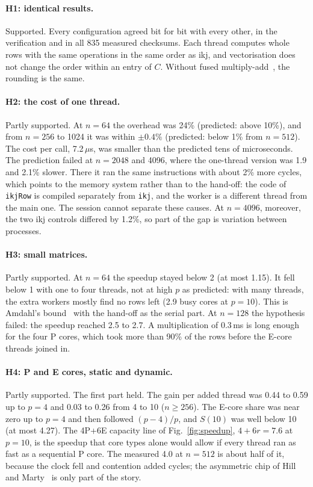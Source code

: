 \documentclass[11pt,a4paper]{article}
\begin{document}
\paragraph{H1: identical results.} Supported. Every configuration agreed bit
for bit with every other, in the verification and in all 835 measured
checksums. Each thread computes whole rows with the same operations in the same
order as ikj, and vectorisation does not change the order within an entry of
$C$. Without fused multiply-add~\cite{jep306}, the rounding is the same.

\paragraph{H2: the cost of one thread.} Partly supported. At $n=64$ the
overhead was 24\% (predicted: above 10\%), and from $n=256$ to 1024 it was
within $\pm0.4\%$ (predicted: below 1\% from $n=512$). The cost per call,
7.2\,$\mu$s, was smaller than the predicted tens of microseconds. The prediction
failed at $n=2048$ and 4096, where the one-thread version was 1.9 and 2.1\%
slower. There it ran the same instructions with about 2\% more cycles, which
points to the memory system rather than to the hand-off: the code of
\texttt{ikjRow} is compiled separately from \texttt{ikj}, and the worker is a
different thread from the main one. The session cannot separate these causes.
At $n=4096$, moreover, the two ikj controls differed by 1.2\%, so part of the
gap is variation between processes.

\paragraph{H3: small matrices.} Partly supported. At $n=64$ the speedup stayed
below 2 (at most 1.15). It fell below 1 with one to four threads, not at high
$p$ as predicted: with many threads, the extra workers mostly find no rows left
(2.9 busy cores at $p=10$). This is Amdahl's bound~\cite{amdahl1967} with the
hand-off as the serial part. At $n=128$ the hypothesis failed: the speedup
reached 2.5 to 2.7. A multiplication of 0.3\,ms is long enough for the four P
cores, which took more than 90\% of the rows before the E-core threads joined
in.

\paragraph{H4: P and E cores, static and dynamic.} Partly supported. The first
part held. The gain per added thread was 0.44 to 0.59 up to $p=4$ and 0.03 to
0.26 from 4 to 10 ($n\ge256$). The E-core share was near zero up to $p=4$ and
then followed $(p-4)/p$, and $S(10)$ was well below 10 (at most 4.27). The 4P+6E
capacity line of Fig.~\ref{fig:speedup}, $4+6r=7.6$ at $p=10$, is the speedup
that core types alone would allow if every thread ran as fast as a sequential P
core. The measured 4.0 at $n=512$ is about half of it, because the clock fell
and contention added cycles; the asymmetric chip of Hill and
Marty~\cite{hill2008} is only part of the story.
\end{document}
